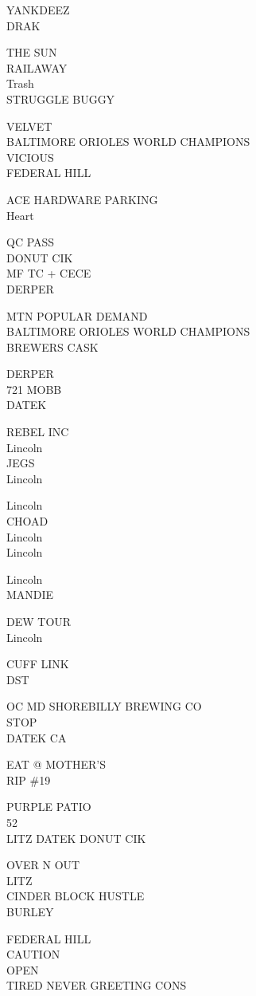 \documentclass[10pt,letterpaper]{article}
\begin{document}
YANKDEEZ\\
DRAK

THE SUN\\
RAILAWAY\\
Trash\\
STRUGGLE BUGGY

VELVET\\
BALTIMORE ORIOLES WORLD CHAMPIONS\\
VICIOUS\\
FEDERAL HILL

ACE HARDWARE PARKING\\
Heart

QC PASS\\
DONUT CIK\\
MF TC + CECE\\
DERPER

MTN POPULAR DEMAND\\
BALTIMORE ORIOLES WORLD CHAMPIONS\\
BREWERS CASK

DERPER\\
721 MOBB\\
DATEK

REBEL INC\\
Lincoln\\
JEGS\\
Lincoln

Lincoln\\
CHOAD\\
Lincoln\\
Lincoln

Lincoln\\
MANDIE

DEW TOUR\\
Lincoln

CUFF LINK\\
DST

OC MD SHOREBILLY BREWING CO\\
STOP\\
DATEK CA

EAT @ MOTHER'S\\
RIP \#19

PURPLE PATIO\\
52\\
LITZ DATEK DONUT CIK

OVER N OUT\\
LITZ\\
CINDER BLOCK HUSTLE\\
BURLEY

FEDERAL HILL\\
CAUTION\\
OPEN\\
TIRED NEVER GREETING CONS
\end{document}
